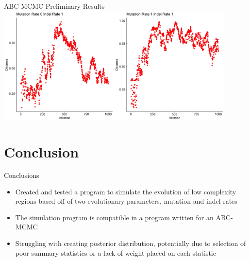 \documentclass{beamer}
\begin{document}
	\begin{frame}{ABC MCMC Preliminary Results}
		\includegraphics[height=6cm, width=\textwidth]{distances.jpeg}
	\end{frame}

	\section{Conclusion}
	\begin{frame}{Conclusions}
		\begin{itemize}
			\item Created and tested a program to simulate the evolution of low complexity regions based off of two evolutionary parameters, mutation and indel rates \newline
			\item The simulation program is compatible in a program written for an ABC-MCMC \newline
			\item Struggling with creating posterior distribution, potentially due to selection of poor summary statistics or a lack of weight placed on each statistic
		\end{itemize}
	\end{frame}

		
			
\end{document}
